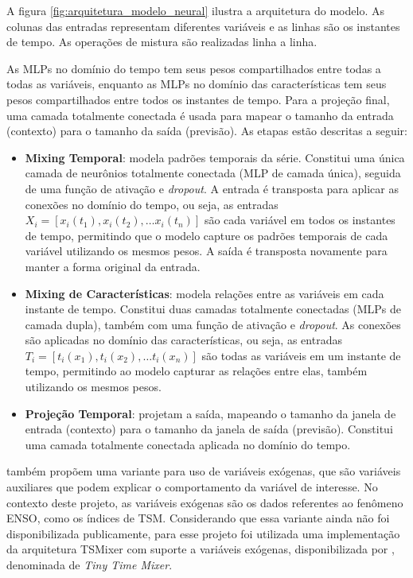 A figura \ref{fig:arquitetura_modelo_neural} ilustra a arquitetura do modelo. As colunas das entradas representam diferentes
variáveis e as linhas são os instantes de tempo. As operações de mistura são realizadas linha a linha. 

As MLPs no domínio do tempo tem seus pesos compartilhados entre todas a todas as variáveis, enquanto as MLPs no domínio das 
características tem seus pesos compartilhados entre todos os instantes de tempo. Para a projeção final, uma camada totalmente 
conectada é usada para mapear o tamanho da entrada (contexto) para o tamanho da saída (previsão). As etapas estão descritas a seguir:

\begin{itemize}
	\item \textbf{Mixing Temporal}: modela padrões temporais da série. Constitui uma única camada de neurônios totalmente
conectada (MLP de camada única), seguida de uma função de ativação e \textit{dropout}. A entrada é transposta para aplicar 
as conexões no domínio do tempo, ou seja, as entradas $ X_i = [x_i(t_1), x_i(t_2), \dots x_i(t_n)] $ são cada variável em todos 
os instantes de tempo, permitindo que o modelo capture os padrões temporais de cada variável utilizando os mesmos pesos.
A saída é transposta novamente para manter a forma original da entrada.

	\item \textbf{Mixing de Características}: modela relações entre as variáveis em cada instante de tempo. Constitui
duas camadas totalmente conectadas (MLPs de camada dupla), também com uma função de ativação e \textit{dropout}. As conexões
são aplicadas no domínio das características, ou seja, as entradas $ T_i = [t_i(x_1), t_i(x_2), \dots t_i(x_n)] $ são
todas as variáveis em um instante de tempo, permitindo ao modelo capturar as relações entre elas, também utilizando os
mesmos pesos.

	\item \textbf{Projeção Temporal}: projetam a saída, mapeando o tamanho da janela de entrada (contexto) para o tamanho 
da janela de saída (previsão). Constitui uma camada totalmente conectada aplicada no domínio do tempo.
\end{itemize}

 também propõem uma variante para uso de variáveis exógenas, que são variáveis auxiliares que podem
explicar o comportamento da variável de interesse. No contexto deste projeto, as variáveis exógenas são os dados referentes
ao fenômeno ENSO, como os índices de TSM. Considerando que essa variante ainda não foi disponibilizada publicamente,
para esse projeto foi utilizada uma implementação da arquitetura TSMixer com suporte a variáveis exógenas,
disponibilizada por , denominada de \textit{Tiny Time Mixer}.